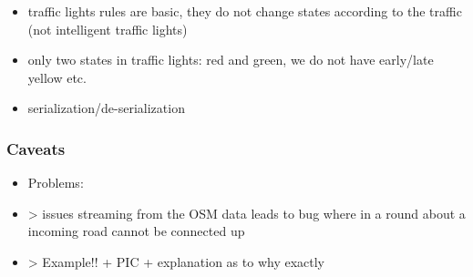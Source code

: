 \begin{itemize}
        \item traffic lights rules are basic, they do not change states according to the traffic (not intelligent traffic lights)
        \item only two states in traffic lights: red and green, we do not have early/late yellow etc.
\end{itemize}
     
\begin{itemize}
	\item serialization/de-serialization
\end{itemize}

\subsubsection{Caveats}
\begin{itemize}
	\item Problems:
	\item > issues streaming from the OSM data leads to bug where in a round about a incoming road cannot be connected up
	\item > Example!! + PIC + explanation as to why exactly
\end{itemize}


